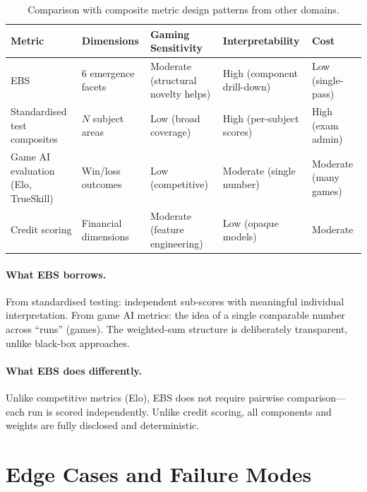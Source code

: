 \documentclass[a4paper, 11pt]{article}
\begin{document}
\begin{table}[ht]
\centering
\caption{Comparison with composite metric design patterns from other domains.}
\label{tab:composite}
\small
\begin{tabular}{@{}p{2.5cm}p{2.5cm}p{2.5cm}p{2.5cm}p{2cm}@{}}
\toprule
\textbf{Metric} & \textbf{Dimensions} & \textbf{Gaming Sensitivity} & \textbf{Interpretability} & \textbf{Cost} \\
\midrule
EBS & 6 emergence facets & Moderate (structural novelty helps) & High (component drill-down) & Low (single-pass) \\
\addlinespace
Standardised test composites & $N$ subject areas & Low (broad coverage) & High (per-subject scores) & High (exam admin) \\
\addlinespace
Game AI evaluation (Elo, TrueSkill) & Win/loss outcomes & Low (competitive) & Moderate (single number) & Moderate (many games) \\
\addlinespace
Credit scoring & Financial dimensions & Moderate (feature engineering) & Low (opaque models) & Moderate \\
\bottomrule
\end{tabular}
\end{table}

\paragraph{What EBS borrows.} From standardised testing: independent sub-scores with meaningful individual interpretation. From game AI metrics: the idea of a single comparable number across ``runs'' (games). The weighted-sum structure is deliberately transparent, unlike black-box approaches.

\paragraph{What EBS does differently.} Unlike competitive metrics (Elo), EBS does not require pairwise comparison---each run is scored independently. Unlike credit scoring, all components and weights are fully disclosed and deterministic.

\section{Edge Cases and Failure Modes}
\end{document}
